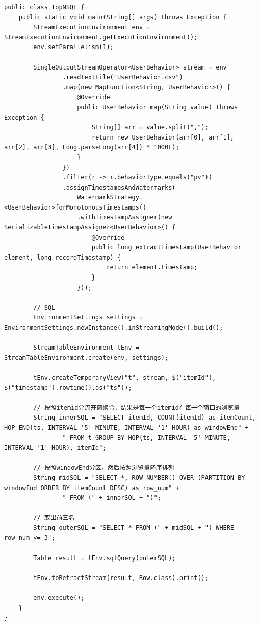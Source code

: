 \documentclass[cn,11pt,chinese]{elegantbook}
\begin{document}
\begin{verbatim}
public class TopNSQL {
    public static void main(String[] args) throws Exception {
        StreamExecutionEnvironment env = StreamExecutionEnvironment.getExecutionEnvironment();
        env.setParallelism(1);

        SingleOutputStreamOperator<UserBehavior> stream = env
                .readTextFile("UserBehavior.csv")
                .map(new MapFunction<String, UserBehavior>() {
                    @Override
                    public UserBehavior map(String value) throws Exception {
                        String[] arr = value.split(",");
                        return new UserBehavior(arr[0], arr[1], arr[2], arr[3], Long.parseLong(arr[4]) * 1000L);
                    }
                })
                .filter(r -> r.behaviorType.equals("pv"))
                .assignTimestampsAndWatermarks(
                    WatermarkStrategy.<UserBehavior>forMonotonousTimestamps()
                    .withTimestampAssigner(new SerializableTimestampAssigner<UserBehavior>() {
                        @Override
                        public long extractTimestamp(UserBehavior element, long recordTimestamp) {
                            return element.timestamp;
                        }
                    }));

        // SQL
        EnvironmentSettings settings = EnvironmentSettings.newInstance().inStreamingMode().build();

        StreamTableEnvironment tEnv = StreamTableEnvironment.create(env, settings);

        tEnv.createTemporaryView("t", stream, $("itemId"), $("timestamp").rowtime().as("ts"));

        // 按照itemid分流开窗聚合，结果是每一个itemid在每一个窗口的浏览量
        String innerSQL = "SELECT itemId, COUNT(itemId) as itemCount, HOP_END(ts, INTERVAL '5' MINUTE, INTERVAL '1' HOUR) as windowEnd" +
                " FROM t GROUP BY HOP(ts, INTERVAL '5' MINUTE, INTERVAL '1' HOUR), itemId";

        // 按照windowEnd分区，然后按照浏览量降序排列
        String midSQL = "SELECT *, ROW_NUMBER() OVER (PARTITION BY windowEnd ORDER BY itemCount DESC) as row_num" +
                " FROM (" + innerSQL + ")";

        // 取出前三名
        String outerSQL = "SELECT * FROM (" + midSQL + ") WHERE row_num <= 3";

        Table result = tEnv.sqlQuery(outerSQL);

        tEnv.toRetractStream(result, Row.class).print();

        env.execute();
    }
}
\end{verbatim}
\end{document}

